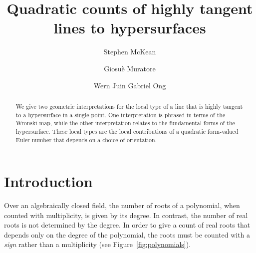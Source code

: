 \documentclass[12pt]{amsart}
\numberwithin{equation}{section}
\theoremstyle{plain}
\theoremstyle{definition}
\begin{document}
\title{Quadratic counts of highly tangent lines to hypersurfaces}

\author[McKean]{Stephen McKean}
\address{Department of Mathematics \\ Brigham Young University} 

\author[Muratore]{Giosu{\`e} Muratore}
\address{CEMS.UL (University of Lisbon), and  
COPELABS/DEISI (Lus\'ofona University)}

\author[Ong]{Wern Juin Gabriel Ong}
\address{Department of Mathematics \\ Universit\"at Bonn}




\begin{abstract}
We give two geometric interpretations for the local type of a line that is highly tangent to a hypersurface in a single point. One interpretation is phrased in terms of the Wronski map, while the other interpretation relates to the fundamental forms of the hypersurface. These local types are the local contributions of a quadratic form-valued Euler number that depends on a choice of orientation.
\end{abstract}

\maketitle

\section{Introduction}
Over an algebraically closed field, the number of roots of a polynomial, when counted with multiplicity, is given by its degree. In contrast, the number of real roots is not determined by the degree. In order to give a count of real roots that depends only on the degree of the polynomial, the roots must be counted with a \emph{sign} rather than a multiplicity (see Figure~\ref{fig:polynomials}).
\end{document}
